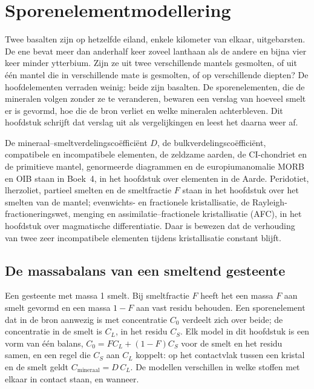 \chapter{Sporenelementmodellering}\label{ch:b3:trace-element-modelling}

Twee basalten zijn op hetzelfde eiland, enkele kilometer van elkaar, uitgebarsten. De ene
bevat meer dan anderhalf keer zoveel lanthaan als de andere en bijna vier keer
minder ytterbium. Zijn ze uit twee verschillende mantels gesmolten, of uit één mantel die
in verschillende mate is gesmolten, of op verschillende diepten? De hoofdelementen
verraden weinig: beide zijn basalten. De sporenelementen, die de mineralen volgen zonder ze te veranderen,
bewaren een verslag van hoeveel smelt er is gevormd, hoe die de bron verliet en
welke mineralen achterbleven. Dit hoofdstuk schrijft dat verslag
uit als vergelijkingen en leest het daarna weer af.

\begin{recall}
De mineraal--smeltverdelingscoëfficiënt $D$, de bulkverdelingscoëfficiënt,
compatibele en incompatibele elementen, de zeldzame aarden, de CI-chondriet
en de primitieve mantel, genormeerde diagrammen en de europiumanomalie
MORB en OIB staan in Boek~4, in het hoofdstuk over elementen in
de Aarde. Peridotiet, lherzoliet, partieel smelten en de smeltfractie $F$
staan in het hoofdstuk over het smelten van de mantel; evenwichts- en fractionele
kristallisatie, de Rayleigh-fractioneringswet, menging en
assimilatie--fractionele kristallisatie (AFC), in het hoofdstuk over magmatische
differentiatie. Daar is bewezen dat de verhouding van twee zeer incompatibele
elementen tijdens kristallisatie constant blijft.
\end{recall}

\section{De massabalans van een smeltend gesteente}\label{sec:b3:trace-element-modelling:balance}

Een gesteente met massa 1 smelt. Bij smeltfractie $F$ heeft het een massa $F$ aan
smelt gevormd en een massa $1 - F$ aan vast residu behouden. Een sporenelement dat in de bron aanwezig is met
concentratie $C_0$ verdeelt zich over beide; de concentratie
in de smelt is $C_L$, in het residu $C_S$. Elk model in dit hoofdstuk is een
vorm van één balans, $C_0 = FC_L + (1 - F)C_S$ voor de smelt en het residu samen,
en een regel die $C_S$ aan $C_L$ koppelt: op het contactvlak tussen een kristal en
de smelt geldt $C_{\text{mineraal}} = D\,C_L$. De modellen verschillen in welke
stoffen met elkaar in contact staan, en wanneer.

